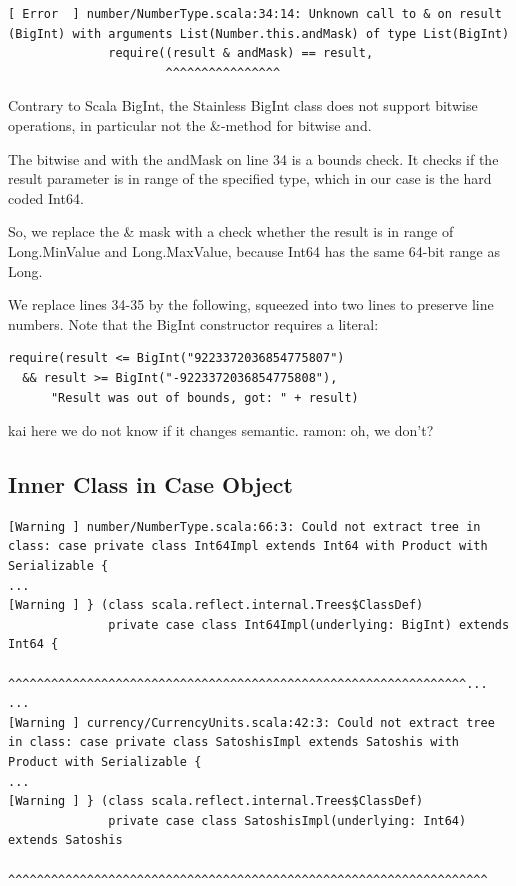 \documentclass[runningheads]{llncs}
\newcommand{\todo}[1]{{\par \color{red}#1}}
\begin{document}
\begin{lstlisting}[style=stainless]
[ Error  ] number/NumberType.scala:34:14: Unknown call to & on result (BigInt) with arguments List(Number.this.andMask) of type List(BigInt)
              require((result & andMask) == result,
                      ^^^^^^^^^^^^^^^^
\end{lstlisting}

Contrary to Scala BigInt, the Stainless BigInt class does not support
bitwise operations, in particular not the \&-method for bitwise and.

The bitwise and with the andMask on line 34 is a bounds check.  It
checks if the result parameter is in range of the specified type,
which in our case is the hard coded Int64.

So, we replace the \& mask with a check whether the result
is in range of Long.MinValue and Long.MaxValue, because Int64 has the
same 64-bit range as Long.  

We replace lines 34-35 by the following, squeezed into two lines to
preserve line numbers. Note that the BigInt constructor requires a
literal:

\begin{lstlisting}[style=scala]
require(result <= BigInt("9223372036854775807")  
  && result >= BigInt("-9223372036854775808"),
      "Result was out of bounds, got: " + result)
\end{lstlisting}


\todo{kai here we do not know if it changes semantic. ramon: oh, we don't?}



\subsection{Inner Class in Case Object}

\begin{lstlisting}[style=stainless]
[Warning ] number/NumberType.scala:66:3: Could not extract tree in class: case private class Int64Impl extends Int64 with Product with Serializable {
...
[Warning ] } (class scala.reflect.internal.Trees$ClassDef)
              private case class Int64Impl(underlying: BigInt) extends Int64 {
              ^^^^^^^^^^^^^^^^^^^^^^^^^^^^^^^^^^^^^^^^^^^^^^^^^^^^^^^^^^^^^^^^...
...
[Warning ] currency/CurrencyUnits.scala:42:3: Could not extract tree in class: case private class SatoshisImpl extends Satoshis with Product with Serializable {
...
[Warning ] } (class scala.reflect.internal.Trees$ClassDef)
              private case class SatoshisImpl(underlying: Int64) extends Satoshis
              ^^^^^^^^^^^^^^^^^^^^^^^^^^^^^^^^^^^^^^^^^^^^^^^^^^^^^^^^^^^^^^^^^^^
\end{lstlisting}
\end{document}

